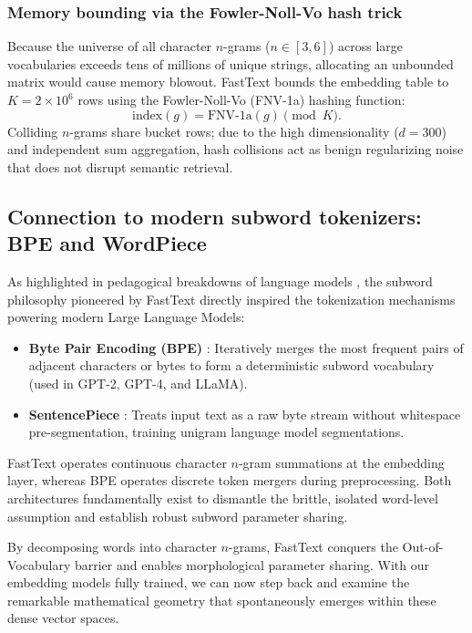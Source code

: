 \documentclass[../../../main.tex]{subfiles}
\begin{document}
\subsubsection{Memory bounding via the Fowler-Noll-Vo hash trick}
Because the universe of all character $n$-grams ($n \in [3, 6]$) across large vocabularies exceeds tens of millions of unique strings, allocating an unbounded matrix would cause memory blowout. FastText bounds the embedding table to $K = 2 \times 10^6$ rows using the Fowler-Noll-Vo (FNV-1a) hashing function:
\begin{equation}
\label{eq:fnv_hash}
\text{index}(g) = \text{FNV-1a}(g) \pmod K.
\end{equation}
Colliding $n$-grams share bucket rows; due to the high dimensionality ($d = 300$) and independent sum aggregation, hash collisions act as benign regularizing noise that does not disrupt semantic retrieval.

\subsection{Connection to modern subword tokenizers: BPE and WordPiece}
\label{subsec:subword_tokenizers_link}

As highlighted in pedagogical breakdowns of language models \cite{enkk2023embeddings}, the subword philosophy pioneered by FastText directly inspired the tokenization mechanisms powering modern Large Language Models:
\begin{itemize}
    \item \textbf{Byte Pair Encoding (BPE)} \cite{sennrich2016,radford2019}: Iteratively merges the most frequent pairs of adjacent characters or bytes to form a deterministic subword vocabulary (used in GPT-2, GPT-4, and LLaMA).
    \item \textbf{SentencePiece} \cite{kudo2018}: Treats input text as a raw byte stream without whitespace pre-segmentation, training unigram language model segmentations.
\end{itemize}
FastText operates continuous character $n$-gram summations at the embedding layer, whereas BPE operates discrete token mergers during preprocessing. Both architectures fundamentally exist to dismantle the brittle, isolated word-level assumption and establish robust subword parameter sharing.

By decomposing words into character $n$-grams, FastText conquers the Out-of-Vocabulary barrier and enables morphological parameter sharing. With our embedding models fully trained, we can now step back and examine the remarkable mathematical geometry that spontaneously emerges within these dense vector spaces.
\end{document}
